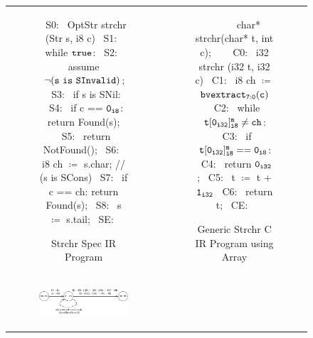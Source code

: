 \begin{figure}
\begin{tabular}{cc}
\begin{subfigure}[b]{0.55\textwidth}
\begin{center}
\begin{specIRLangEnvScript}
~{\tiny \textcolor{mygray}{S0:}}~ OptStr strchr (Str s, i8 c) {
~{\tiny \textcolor{mygray}{S1:}}~   while ${\tt true}$:
~{\tiny \textcolor{mygray}{S2:}}~     assume ${\tt \neg (s\ is\ SInvalid)}$;
~{\tiny \textcolor{mygray}{S3:}}~     if s is SNil:
~{\tiny \textcolor{mygray}{S4:}}~       if c == ${\tt 0_{i8}}$: return Found(s);
~{\tiny \textcolor{mygray}{S5:}}~       return NotFound();
~{\tiny \textcolor{mygray}{S6:}}~     i8 ch $\coloneq$ s.char; // (s is SCons)
~{\tiny \textcolor{mygray}{S7:}}~     if c == ch: return Found(s);
~{\tiny \textcolor{mygray}{S8:}}~     s $\coloneq$ s.tail;
~{\tiny \textcolor{mygray}{SE:}}~ }
\end{specIRLangEnvScript}
\end{center}
\caption{\label{fig:llStrchrSpecIR}Strchr Spec IR Program}
\end{subfigure}%
&
\begin{subfigure}[b]{0.46\textwidth}
\begin{center}
\begin{cIRLangEnvScript}
~{\tiny \textcolor{mygray}{\ \ \ }}~ char* strchr(char* t, int c);
~{\tiny \textcolor{mygray}{}}~
~{\tiny \textcolor{mygray}{C0:}}~ i32 strchr (i32 t, i32 c) {
~{\tiny \textcolor{mygray}{C1:}}~   i8 ch $\coloneq$ ${\tt bvextract_{7:0}(c)}$
~{\tiny \textcolor{mygray}{C2:}}~   while $\mathrm{\tt t[0_{i32}]^m_{i8} \neq ch}$:
~{\tiny \textcolor{mygray}{C3:}}~     if $\mathrm{\tt t[0_{i32}]^m_{i8} == 0_{i8}}$:
~{\tiny \textcolor{mygray}{C4:}}~       return ${\tt 0_{i32}}$;
~{\tiny \textcolor{mygray}{C5:}}~     t $\coloneq$ t + ${\tt 1_{i32}}$
~{\tiny \textcolor{mygray}{C6:}}~   return t;
~{\tiny \textcolor{mygray}{CE:}}~ }
\end{cIRLangEnvScript}
\end{center}
\caption{\label{fig:llStrchrCArrIR}Generic Strchr C IR Program using Array}
\end{subfigure}%
\\
\begin{subfigure}[b]{0.55\textwidth}
\begin{center}
{\includegraphics[scale=0.87]{figStrchrProductCfg.pdf}}

\end{center}
\end{subfigure}
\end{tabular}
\end{figure}
